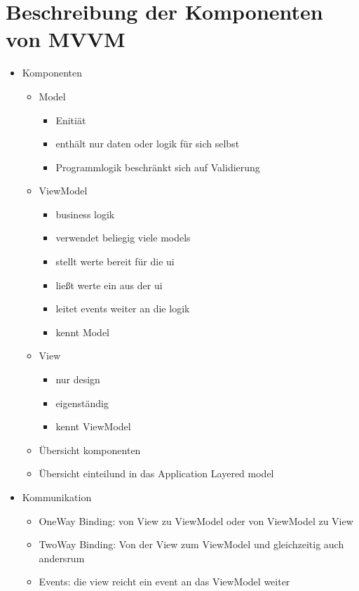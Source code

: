 \documentclass[titlepage=false,12pt]{scrreprt}
\begin{document}
	\chapter{Beschreibung der Komponenten von MVVM}
	\begin{itemize}
		\item Komponenten
		\begin{itemize}
			\item Model
			\begin{itemize}
				\item Enitiät
				\item enthält nur daten oder logik für sich selbst
				\item Programmlogik beschränkt sich auf Validierung
			\end{itemize}
			\item ViewModel
			\begin{itemize}
				\item business logik
				\item verwendet beliegig viele models
				\item stellt werte bereit für die ui
				\item ließt werte ein aus der ui
				\item leitet events weiter an die logik
				\item kennt Model
			\end{itemize}
			\item View
			\begin{itemize}
				\item nur design
				\item eigenständig
				\item kennt ViewModel 
			\end{itemize}
			\item Übersicht komponenten
			\item Übersicht einteilund in das Application Layered model
		\end{itemize}
		\item Kommunikation
		\begin{itemize}
			\item OneWay Binding: von View zu ViewModel oder von ViewModel zu View
			\item TwoWay Binding: Von der View zum ViewModel und gleichzeitig auch andersrum
			\item Events: die view reicht ein event an das ViewModel weiter 
		\end{itemize}
	\end{itemize}
\end{document}
